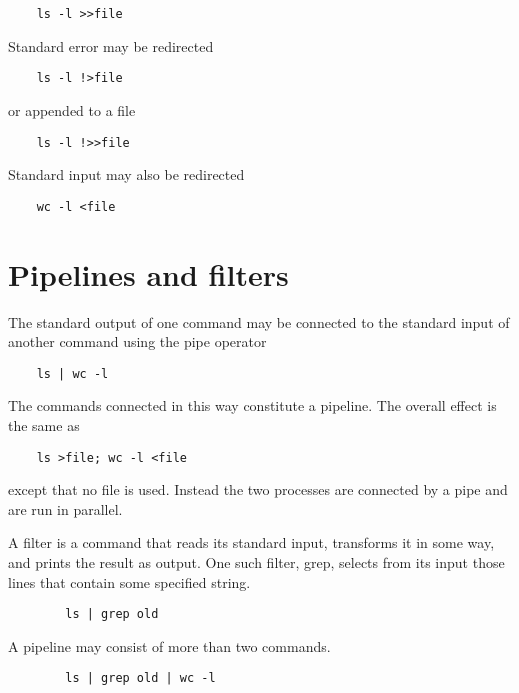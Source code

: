 \documentclass[12pt]{book}
\begin{document}
\begin{lstlisting}
	ls -l >>file
\end{lstlisting}

Standard error may be redirected

\begin{lstlisting}
	ls -l !>file
\end{lstlisting}

or appended to a file

\begin{lstlisting}
	ls -l !>>file
\end{lstlisting}

Standard input may also be redirected

\begin{lstlisting}
	wc -l <file
\end{lstlisting}


\section{Pipelines and filters}

The standard output of one command may be connected to the standard
input of another command using the pipe operator

\begin{lstlisting}
	ls | wc -l
\end{lstlisting}

The commands connected in this way constitute a pipeline. The
overall effect is the same as

\begin{lstlisting}
	ls >file; wc -l <file
\end{lstlisting}

except that no file is used. Instead the two processes are connected
by a pipe and are run in parallel.

A filter is a command that reads its standard input, transforms it
in some way, and prints the result as output. One such filter, grep,
selects from its input those lines that contain some specified
string. 

\begin{lstlisting}
    	ls | grep old
\end{lstlisting}

A pipeline may consist of more than two commands.

\begin{lstlisting}
    	ls | grep old | wc -l
\end{lstlisting}
\end{document}
